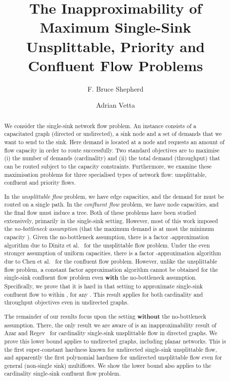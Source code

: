 \documentclass[12pt]{article}
\begin{document}







\title{The Inapproximability of Maximum Single-Sink\\ Unsplittable, Priority and Confluent Flow Problems}
\author{F. Bruce Shepherd \and Adrian Vetta}

\maketitle


\begin{abstract}
We consider the  single-sink network flow problem.
An instance consists of a capacitated graph (directed or undirected),
a sink node  and a set of demands that we want to send to the
sink. Here demand  is located at a node  and
requests an amount  of flow capacity in order to route successfully.
Two standard objectives are to maximise
(i) the number of demands (cardinality) and (ii) the total demand (throughput)
that can be routed subject to the capacity constraints. Furthermore, we examine these maximisation
problems for three specialised types of network flow: unsplittable, confluent and priority flows.

In the {\em unsplittable flow} problem, we have edge capacities, and the demand for  must be
routed on a single path. In the {\em confluent flow} problem, we have node capacities, and the final
flow must induce a tree.
Both of these problems have been studied extensively, primarily in the
single-sink setting. However, most of this work imposed the {\em no-bottleneck assumption}
(that the maximum demand  is at most the minimum capacity ).
Given the no-bottleneck assumption, there is a factor -approximation algorithm due to Dinitz et al.~\cite{Dinitz99}
for the unsplittable flow problem. Under the even stronger assumption of uniform capacities,
there is a factor -approximation algorithm due to Chen et al.~\cite{Chen07} for the confluent flow problem.
However, unlike the unsplittable flow problem, a constant factor approximation algorithm cannot
be obtained for the single-sink confluent flow problem even {\bf with} the no-bottleneck assumption.
Specifically, we prove that it is hard in that setting to approximate single-sink confluent flow to
within , for any .
This result applies for both cardinality and throughput objectives even in undirected graphs.

The remainder of our results focus upon the setting {\bf without} the no-bottleneck assumption.
There, the only result we are aware of is an  inapproximability
result of Azar and Regev~\cite{azar2001strongly} for cardinality single-sink unsplittable flow in directed graphs.
We prove this lower bound applies to undirected graphs, including planar networks.
This is the first super-constant hardness known for undirected single-sink unsplittable flow,
and apparently the first polynomial hardness for undirected unsplittable flow even for general (non-single sink)
multiflows.
We show the lower bound also applies to the cardinality single-sink confluent flow
problem.


\end{abstract}
\end{document}
